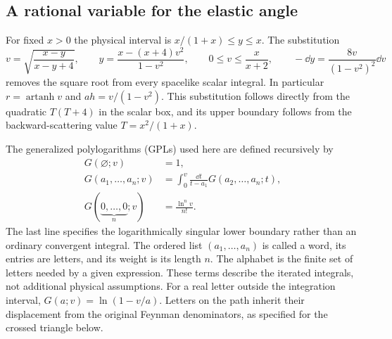\subsection{A rational variable for the elastic angle}
For fixed $x>0$ the physical interval is
$x/(1+x)\leq y\leq x$. The substitution
\begin{equation}
 v=\sqrt{\frac{x-y}{x-y+4}},\qquad
 y=\frac{x-(x+4)v^2}{1-v^2},\qquad
 0\leq v\leq\frac{x}{x+2},\qquad
 -\dd y=\frac{8v}{(1-v^2)^2}\dd v
 \label{eq:comp-supp-box-angle-rationalization}
\end{equation}
removes the square root from every spacelike scalar integral.
In particular $r=\operatorname{artanh}v$ and
$ah=v/(1-v^2)$. This substitution follows directly from the
quadratic $T(T+4)$ in the scalar box, and its upper boundary follows
from the backward-scattering value $T=x^2/(1+x)$.

The generalized polylogarithms (GPLs) used here are defined recursively by
\begin{align}
 G(\varnothing;v)&=1,\\
 G(a_1,\ldots,a_n;v)
 &=\int_0^v\frac{\dd t}{t-a_1}G(a_2,\ldots,a_n;t),\\
 G(\underbrace{0,\ldots,0}_{n};v)&=\frac{\ln^n v}{n!}.
\end{align}
The last line specifies the logarithmically singular lower boundary
rather than an ordinary convergent integral. The ordered list
$(a_1,\ldots,a_n)$ is called a word, its entries are letters, and its
weight is its length $n$. The alphabet is the finite set of letters
needed by a given expression. These terms describe the iterated
integrals, not additional physical assumptions.
For a real letter outside the integration interval,
$G(a;v)=\ln(1-v/a)$. Letters on the path inherit their displacement
from the original Feynman denominators, as specified for the crossed
triangle below.

